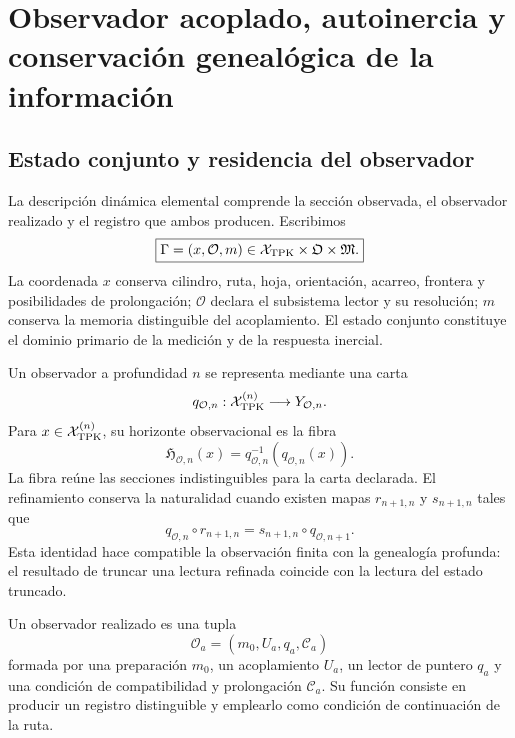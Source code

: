 \chapter{Observador acoplado, autoinercia y conservaci\'on geneal\'ogica de la informaci\'on}
\label{chap:observador-autoinercia-landauer}

\section{Estado conjunto y residencia del observador}

La descripci\'on din\'amica elemental comprende la secci\'on observada, el
observador realizado y el registro que ambos producen. Escribimos
\begin{equation}
 \boxed{\Gamma=(x,\mathcal O,m)\in
 \mathcal X_{\rm TPK}\times\mathfrak O\times\mathfrak M.}
 \label{eq:rm-obs-joint-state}
\end{equation}
La coordenada \(x\) conserva cilindro, ruta, hoja, orientaci\'on, acarreo,
frontera y posibilidades de prolongaci\'on; \(\mathcal O\) declara el
subsistema lector y su resoluci\'on; \(m\) conserva la memoria distinguible
del acoplamiento. El estado conjunto constituye el dominio primario de la
medici\'on y de la respuesta inercial.

Un observador a profundidad \(n\) se representa mediante una carta
\begin{equation}
 q_{\mathcal O,n}:\mathcal X_{\rm TPK}^{(n)}
 \longrightarrow Y_{\mathcal O,n}.
 \label{eq:rm-obs-observer-chart}
\end{equation}
Para \(x\in\mathcal X_{\rm TPK}^{(n)}\), su horizonte observacional es la
fibra
\begin{equation}
 \mathfrak H_{\mathcal O,n}(x)
 =q_{\mathcal O,n}^{-1}(q_{\mathcal O,n}(x)).
 \label{eq:rm-obs-horizon-fiber}
\end{equation}
La fibra re\'une las secciones indistinguibles para la carta declarada. El
refinamiento conserva la naturalidad cuando existen mapas
\(r_{n+1,n}\) y \(s_{n+1,n}\) tales que
\begin{equation}
 q_{\mathcal O,n}\circ r_{n+1,n}
 =s_{n+1,n}\circ q_{\mathcal O,n+1}.
 \label{eq:rm-obs-observer-naturality}
\end{equation}
Esta identidad hace compatible la observaci\'on finita con la genealog\'ia
profunda: el resultado de truncar una lectura refinada coincide con la
lectura del estado truncado.

\begin{definition}
Un observador realizado es una tupla
\begin{equation}
 \mathcal O_a=(m_0,U_a,q_a,\mathcal C_a)
 \label{eq:rm-obs-realized-observer}
\end{equation}
formada por una preparaci\'on \(m_0\), un acoplamiento \(U_a\), un lector
de puntero \(q_a\) y una condici\'on de compatibilidad y prolongaci\'on
\(\mathcal C_a\). Su funci\'on consiste en producir un registro distinguible
y emplearlo como condici\'on de continuaci\'on de la ruta.
\end{definition}

